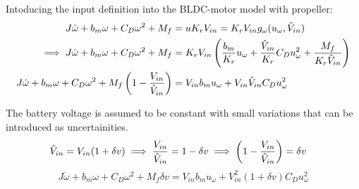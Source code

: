Intoducing the input definition into the BLDC-motor model with propeller:
\begin{align*}
    J\dot \omega + b_m \omega + C_D \omega^2 + M_f &= u K_r V_{in} = K_r V_{in} g_\omega(u_\omega, \hat V_{in})\\
    \implies  J \dot \omega + b_m \omega + C_D \omega^2 + M_f &= K_r V_{in} \left( \frac{b_m}{K_r} u_\omega + \frac{\hat V_{in}}{K_r} C_D u_\omega^2 + \frac{M_f}{K_r  \hat V_{in}} \right)\\
    J \dot \omega + b_m \omega + C_D \omega^2 + M_f \left( 1 - \frac{V_{in}}{\hat V_{in}} \right) &= V_{in} b_m u_\omega + V_{in} \hat V_{in} C_D u_\omega^2
\end{align*}

 The battery voltage is assumed to be constant with small variations that can be introduced as uncertainities.
\begin{align*}
    \hat V_{in} &= V_{in} ( 1 + \delta v)
    \implies \frac{V_{in}}{\hat V_{in}} = 1 - \delta v
    \implies \left( 1 - \frac{V_{in}}{\hat V_{in}} \right) = \delta v
\end{align*}
\begin{equation}
    J \dot \omega + b_m \omega + C_D \omega^2 + M_f \delta v = V_{in} b_m u_\omega + V_{in}^2 (1 + \delta v) C_D u_\omega^2
\end{equation}

